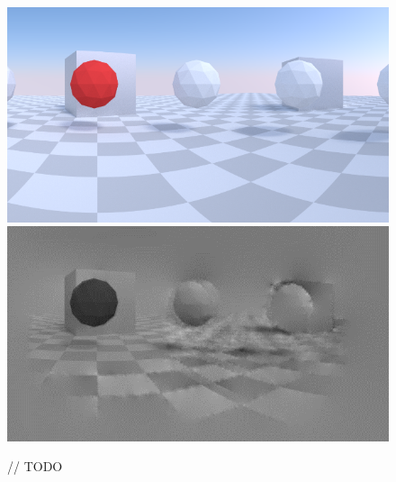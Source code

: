 \begin{figure}
\includegraphics[width=\columnwidth]{images/zigzag_input.png}
\includegraphics[width=\columnwidth]{images/zigzag_reconstruction.png}
\caption{// TODO}
\label{fig:zigzag_reconstruction}
\end{figure}
